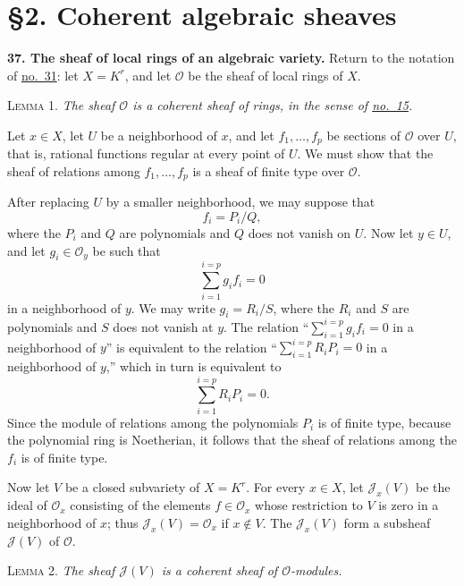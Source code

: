
\label{fac:II:2}
\section*{\S2. Coherent algebraic sheaves}

\label{fac:II:2:no:37}
\textbf{37. The sheaf of local rings of an algebraic variety.}
Return to the notation of \hyperref[fac:II:1:no:31]{no.~31}: let $X=K^r$, and let $\mathcal{O}$ be the sheaf of local rings of $X$.

\label{fac:II:2:no:37:lemma:1}
\textsc{Lemma 1.} \textit{The sheaf $\mathcal{O}$ is a coherent sheaf of rings, in the sense of \hyperref[fac:I:2:no:15]{no.~15}.}

Let $x\in X$, let $U$ be a neighborhood of $x$, and let $f_1,\ldots,f_p$ be sections of $\mathcal{O}$ over $U$, that is, rational functions regular at every point of $U$. We must show that the sheaf of relations among $f_1,\ldots,f_p$ is a sheaf of finite type over $\mathcal{O}$.

After replacing $U$ by a smaller neighborhood, we may suppose that
\[
f_i=P_i/Q,
\]
where the $P_i$ and $Q$ are polynomials and $Q$ does not vanish on $U$. Now let $y\in U$, and let $g_i\in\mathcal{O}_y$ be such that
\[
\sum_{i=1}^{i=p}g_i f_i=0
\]
in a neighborhood of $y$. We may write $g_i=R_i/S$, where the $R_i$ and $S$ are polynomials and $S$ does not vanish at $y$. The relation ``$\sum_{i=1}^{i=p}g_i f_i=0$ in a neighborhood of $y$'' is equivalent to the relation ``$\sum_{i=1}^{i=p}R_iP_i=0$ in a neighborhood of $y$,'' which in turn is equivalent to
\[
\sum_{i=1}^{i=p}R_iP_i=0.
\]
Since the module of relations among the polynomials $P_i$ is of finite type, because the polynomial ring is Noetherian, it follows that the sheaf of relations among the $f_i$ is of finite type.

Now let $V$ be a closed subvariety of $X=K^r$. For every $x\in X$, let $\mathcal{J}_x(V)$ be the ideal of $\mathcal{O}_x$ consisting of the elements $f\in\mathcal{O}_x$ whose restriction to $V$ is zero in a neighborhood of $x$; thus $\mathcal{J}_x(V)=\mathcal{O}_x$ if $x\notin V$. The $\mathcal{J}_x(V)$ form a subsheaf $\mathcal{J}(V)$ of $\mathcal{O}$.

\label{fac:II:2:no:37:lemma:2}
\textsc{Lemma 2.} \textit{The sheaf $\mathcal{J}(V)$ is a coherent sheaf of $\mathcal{O}$-modules.}

